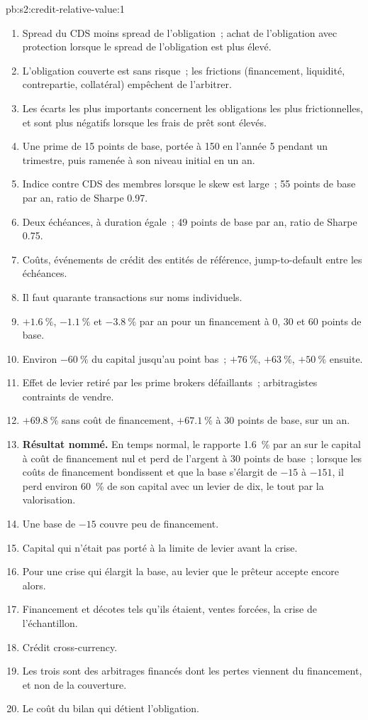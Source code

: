 \begin{solution}{pb:s2:credit-relative-value:1}
\begin{enumerate}
\item Spread du CDS moins spread de l'obligation~; achat de l'obligation avec protection lorsque le spread de l'obligation est plus élevé.
\item L'obligation couverte est sans risque~; les frictions (financement, liquidité, contrepartie, collatéral) empêchent de l'arbitrer.
\item Les écarts les plus importants concernent les obligations les plus frictionnelles, et sont plus négatifs lorsque les frais de prêt sont élevés.
\item Une prime de 15 points de base, portée à 150 en l'année 5 pendant un trimestre, puis ramenée à son niveau initial en un an.
\item Indice contre CDS des membres lorsque le skew est large~; 55 points de base par an, ratio de Sharpe 0.97.
\item Deux échéances, à duration égale~; 49 points de base par an, ratio de Sharpe 0.75.
\item Coûts, événements de crédit des entités de référence, jump-to-default entre les échéances.
\item Il faut quarante transactions sur noms individuels.
\item $+1.6~\%$, $-1.1~\%$ et $-3.8~\%$ par an pour un financement à 0, 30 et 60 points de base.
\item Environ $-60~\%$ du capital jusqu'au point bas~; $+76~\%$, $+63~\%$, $+50~\%$ ensuite.
\item Effet de levier retiré par les prime brokers défaillants~; arbitragistes contraints de vendre.
\item $+69.8~\%$ sans coût de financement, $+67.1~\%$ à 30 points de base, sur un an.
\item \textbf{Résultat nommé.} En temps normal, le  rapporte 1.6~\% par an sur le capital à coût de financement nul et perd de l'argent à 30 points de
base~; lorsque les coûts de financement bondissent et que la base s'élargit de $-15$ à $-151$, il perd environ 60~\% de son capital avec un levier de dix, le tout par la valorisation.
\item Une base de $-15$ couvre peu de financement.
\item Capital qui n'était pas porté à la limite de levier avant la crise.
\item Pour une crise qui élargit la base, au levier que le prêteur accepte encore alors.
\item Financement et décotes tels qu'ils étaient, ventes forcées, la crise de l'échantillon.
\item Crédit cross-currency.
\item Les trois sont des arbitrages financés dont les pertes viennent du financement, et non de la couverture.
\item Le coût du bilan qui détient l'obligation.
\end{enumerate}
\end{solution}

